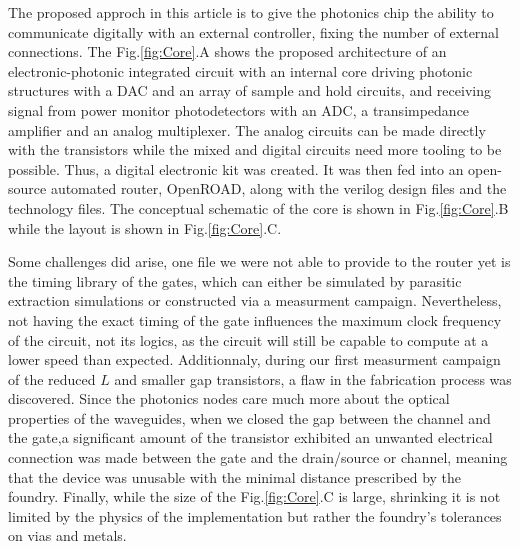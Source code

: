 The proposed approch in this article is to give the photonics chip the ability to communicate digitally with an external controller, fixing the number of external connections. 
The Fig.\ref{fig:Core}.A shows the proposed architecture of an electronic-photonic integrated circuit with an internal core driving photonic structures with a DAC and an array of sample and hold circuits, and receiving signal from power monitor photodetectors with an ADC, a transimpedance amplifier and an analog multiplexer. 
The analog circuits can be made directly with the transistors while the mixed and digital circuits need more tooling to be possible. 
Thus, a digital electronic kit was created.
It was then fed into an open-source automated router, OpenROAD\cite{ajayi_openroad_2019}, along with the verilog design files and the technology files. 
The conceptual schematic of the core is shown in Fig.\ref{fig:Core}.B while the layout is shown in Fig.\ref{fig:Core}.C.

Some challenges did arise, one file we were not able to provide to the router yet is the timing library of the gates, which can either be simulated by parasitic extraction simulations or constructed via a measurment campaign.  
Nevertheless, not having the exact timing of the gate influences the maximum clock frequency of the circuit, not its logics, as the circuit will still be capable to compute at a lower speed than expected. 
Additionnaly, during our first measurment campaign of the reduced $L$ and smaller gap transistors, a flaw in the fabrication process was discovered. 
Since the photonics nodes care much more about the optical properties of the waveguides, when we closed the gap between the channel and the gate,a significant amount of the transistor exhibited an unwanted electrical connection was made between the gate and the drain/source or channel, meaning that the device was unusable with the minimal distance prescribed by the foundry. 
Finally, while the size of the Fig.\ref{fig:Core}.C is large, shrinking it is not limited by the physics of the implementation but rather the foundry's tolerances on vias and metals.
 



